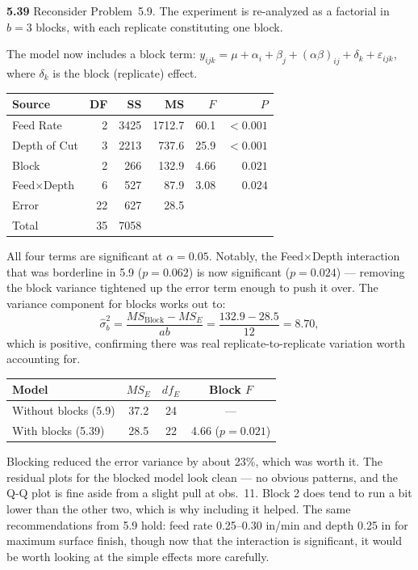\documentclass[answers,12pt,addpoints]{exam}
\begin{document}
\textbf{5.39}  Reconsider Problem~5.9.  The experiment is re-analyzed as
a factorial in $b=3$ blocks, with each replicate constituting one block.

\begin{solution}
The model now includes a block term: $y_{ijk} = \mu + \alpha_i + \beta_j + (\alpha\beta)_{ij} + \delta_k + \varepsilon_{ijk}$, where $\delta_k$ is the block (replicate) effect.

\begin{center}
\begin{tabular}{lrrrrr}
\hline
Source              & DF &  SS    &  MS     & $F$    & $P$          \\
\hline
Feed Rate           &  2 & 3425   & 1712.7  & 60.1   & $<0.001$ \\
Depth of Cut        &  3 & 2213   &  737.6  & 25.9   & $<0.001$ \\
Block               &  2 &  266   &  132.9  &  4.66  & $0.021$     \\
Feed$\times$Depth   &  6 &  527   &   87.9  &  3.08  & $0.024$     \\
Error               & 22 &  627   &   28.5  &        &              \\
\hline
Total               & 35 & 7058   &         &        &              \\
\hline
\end{tabular}
\end{center}

All four terms are significant at $\alpha = 0.05$. Notably, the Feed$\times$Depth interaction that was borderline in 5.9 ($p = 0.062$) is now significant ($p = 0.024$) — removing the block variance tightened up the error term enough to push it over. The variance component for blocks works out to:
\[
  \hat{\sigma}^2_b = \frac{MS_{\text{Block}} - MS_E}{ab} = \frac{132.9 - 28.5}{12} = 8.70,
\]
which is positive, confirming there was real replicate-to-replicate variation worth accounting for.

\begin{center}
\begin{tabular}{lccc}
\hline
Model                  & $MS_E$  & $df_E$ & Block $F$ \\
\hline
Without blocks (5.9)   & 37.2    &  24    & ---       \\
With blocks (5.39)     & 28.5    &  22    & 4.66 ($p=0.021$) \\
\hline
\end{tabular}
\end{center}

Blocking reduced the error variance by about 23\%, which was worth it. The residual plots for the blocked model look clean — no obvious patterns, and the Q-Q plot is fine aside from a slight pull at obs.\ 11. Block 2 does tend to run a bit lower than the other two, which is why including it helped. The same recommendations from 5.9 hold: feed rate 0.25--0.30 in/min and depth 0.25 in for maximum surface finish, though now that the interaction is significant, it would be worth looking at the simple effects more carefully.

\end{solution}
\end{document}
